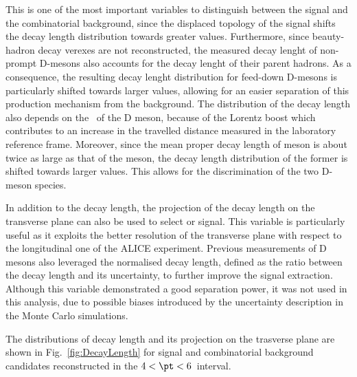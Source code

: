This is one of the most important variables to distinguish between the signal and the combinatorial background, since the displaced topology of the signal shifts the decay length distribution towards greater values. Furthermore, since beauty-hadron decay verexes are not reconstructed, the measured decay lenght of non-prompt D-mesons also accounts for the decay lenght of their parent hadrons. As a consequence, the resulting decay lenght distribution for feed-down D-mesons is particularly shifted towards larger values, allowing for an easier separation of this production mechanism from the background. The distribution of the decay length also depends on the \pt\ of the D meson, because of the Lorentz boost which contributes to an increase in the travelled distance measured in the laboratory reference frame. Moreover, since the mean proper decay length of \dpl meson is about twice as large as that of the \ds meson, the decay length distribution of the former is shifted towards larger values. This allows for the discrimination of the two D-meson species.

In addition to the decay length, the projection of the decay length on the transverse plane can also be used to select \ds or \dpl signal. This variable is particularly useful as it exploits the better resolution of the transverse plane with respect to the longitudinal one of the ALICE experiment. Previous measurements of D mesons also leveraged the normalised decay length, defined as the ratio between the decay length and its uncertainty, to further improve the signal extraction. Although this variable demonstrated a good separation power, it was not used in this analysis, due to possible biases introduced by the uncertainty description in the Monte Carlo simulations.

The distributions of decay length and its projection on the trasverse plane are shown in Fig.~\ref{fig:DecayLength} for signal and combinatorial background candidates reconstructed in the $4 < \pt < 6$~\gevc interval. 

